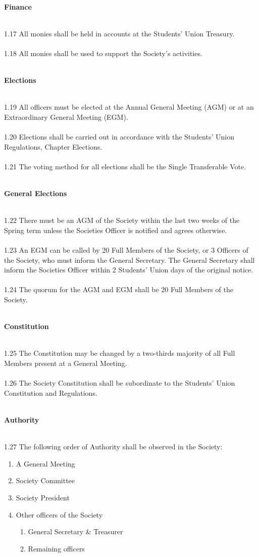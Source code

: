 \documentclass[a4paper,twoside,notitlepage,11pt]{article}
\newcommand{\consHead}[1]{\begin{Large}\textbf{#1}\end{Large}\ \\}
\begin{document}
\ \\
\consHead{Finance}
1.17 All monies shall be held in accounts at the Students' Union Treasury.\ \\
\ \\
1.18 All monies shall be used to support the Society's activities.\ \\
\ \\
\consHead{Elections}
1.19 All officers must be elected at the Annual General Meeting (AGM) or at an Extraordinary General Meeting (EGM).\ \\
\ \\
1.20 Elections shall be carried out in accordance with the Students' Union Regulations, Chapter Elections.\ \\
\ \\
1.21 The voting method for all elections shall be the Single Transferable Vote.\ \\
\ \\
\consHead{General Elections}
1.22 There must be an AGM of the Society within the last two weeks of the Spring term unless the Societies Officer is notified and agrees otherwise.\ \\
\ \\
1.23 An EGM can be called by 20 Full Members of the Society, or 3 Officers of the Society, who must inform the General Secretary. The General Secretary shall inform the Societies Officer within 2 Students' Union days of the original notice.\ \\
\ \\
1.24 The quorum for the AGM and EGM shall be 20 Full Members of the Society. 
\ \\
\ \\
\consHead{Constitution}
1.25	The Constitution may be changed by a two-thirds majority of all Full Members present at a General Meeting.\ \\
\ \\
1.26 The Society Constitution shall be subordinate to the Students' Union Constitution and Regulations.
\ \\
\ \\
\consHead{Authority}
1.27 The following order of Authority shall be observed in the Society:
\begin{enumerate}
	\item A General Meeting
	\item Society Committee
	\item Society President
	\item Other officers of the Society
	\begin{enumerate}
		\item General Secretary \& Treasurer
		\item Remaining officers
	\end{enumerate}
\end{enumerate}
\end{document}
